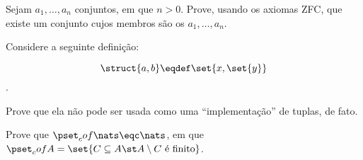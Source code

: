 \begin{exercise}
    Sejam $a_1, \dots, a_n$ conjuntos, em que $n>0$. Prove, usando os axiomas ZFC, que existe um conjunto 
    cujos membros são os $a_1, \dots, a_n$.
\end{exercise}

\begin{exercise}
    Considere a seguinte definição:

    $$\struct{a,b} \eqdef \set{x, \set{y}}$$.

    Prove que ela não pode ser usada como uma ``implementação'' de tuplas, de fato.
\end{exercise}

\begin{exercise}
Prove que $\pset_cof\nats \eqc \nats$, em que $\pset_cof A = \set{C \subseteq A \st A\setminus C \text{ é finito}}$.
\end{exercise}